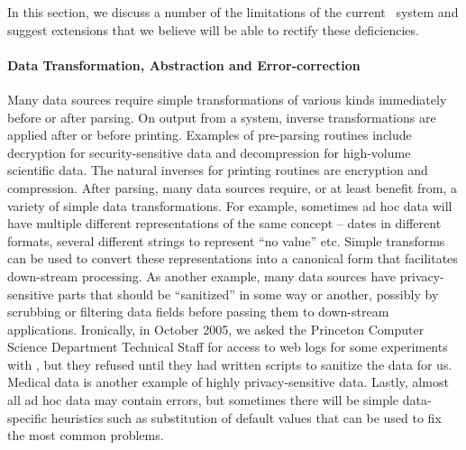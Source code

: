 
In this
section, we discuss a number of the limitations of the current \pads{}\ 
system and suggest extensions that we believe will be able to rectify
these deficiencies.  

\paragraph*{Data Transformation, Abstraction and Error-correction}
Many data sources require simple transformations of various kinds
immediately before or after parsing.  On output from a system,
inverse transformations are applied after or before printing.  
Examples of pre-parsing routines include decryption for
security-sensitive data and decompression for high-volume scientific data.  
The natural inverses for printing routines are encryption and compression.
After parsing, many data sources require, or at least benefit from,
a variety of simple data transformations.  For example,
sometimes ad hoc data will have multiple different representations
of the same concept -- dates in different formats, several different strings
to represent ``no value'' etc.  Simple transforms can be used to convert
these representations into a canonical form that facilitates down-stream
processing.  As another example, many data sources have privacy-sensitive parts
that should be ``sanitized'' in some way or another, possibly by scrubbing or
filtering data fields before passing them to down-stream applications.
Ironically, in October 2005, we asked the Princeton Computer Science
Department Technical Staff for access to web logs for some experiments
with \pads, but they refused until they had written scripts to
sanitize the data for us.  Medical data is another example of highly
privacy-sensitive data.
Lastly, almost all ad hoc data may contain errors, but sometimes there will be simple data-specific heuristics such as substitution of default values
that can be used to fix the most common problems.

